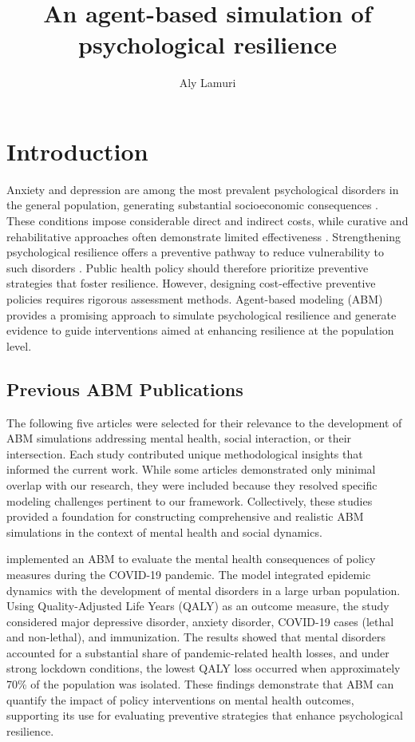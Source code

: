\documentclass[
  letterpaper,
  DIV=11,
  numbers=noendperiod]{scrartcl}
\title{An agent-based simulation of psychological resilience}
\author{Aly Lamuri}
\date{}
\begin{document}
\maketitle


\section{Introduction}\label{introduction}

Anxiety and depression are among the most prevalent psychological
disorders in the general population, generating substantial
socioeconomic consequences \citep{gbd2022global, arias2022quantifying}.
These conditions impose considerable direct and indirect costs, while
curative and rehabilitative approaches often demonstrate limited
effectiveness \citep{mekonen2021estimating}. Strengthening psychological
resilience offers a preventive pathway to reduce vulnerability to such
disorders \citep{troy2023psychological}. Public health policy should
therefore prioritize preventive strategies that foster resilience.
However, designing cost-effective preventive policies requires rigorous
assessment methods. Agent-based modeling (ABM) provides a promising
approach to simulate psychological resilience and generate evidence to
guide interventions aimed at enhancing resilience at the population
level.

\subsection{Previous ABM Publications}\label{previous-abm-publications}

The following five articles were selected for their relevance to the
development of ABM simulations addressing mental health, social
interaction, or their intersection. Each study contributed unique
methodological insights that informed the current work. While some
articles demonstrated only minimal overlap with our research, they were
included because they resolved specific modeling challenges pertinent to
our framework. Collectively, these studies provided a foundation for
constructing comprehensive and realistic ABM simulations in the context
of mental health and social dynamics.

\citet{Romanyukha2023} implemented an ABM to evaluate the mental health
consequences of policy measures during the COVID-19 pandemic. The model
integrated epidemic dynamics with the development of mental disorders in
a large urban population. Using Quality-Adjusted Life Years (QALY) as an
outcome measure, the study considered major depressive disorder, anxiety
disorder, COVID-19 cases (lethal and non-lethal), and immunization. The
results showed that mental disorders accounted for a substantial share
of pandemic-related health losses, and under strong lockdown conditions,
the lowest QALY loss occurred when approximately 70\% of the population
was isolated. These findings demonstrate that ABM can quantify the
impact of policy interventions on mental health outcomes, supporting its
use for evaluating preventive strategies that enhance psychological
resilience.
\end{document}
